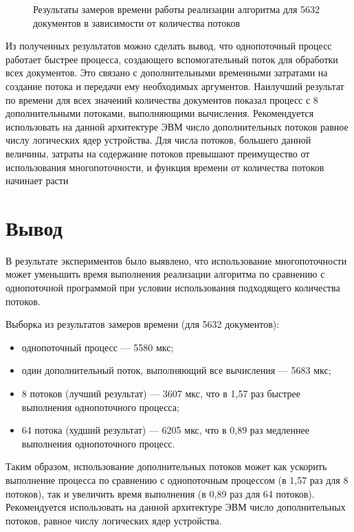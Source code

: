 \clearpage

\begin{figure}[h!]
	\centering
	\caption{Результаты замеров времени работы реализации алгоритма для 5632 документов в зависимости от количества потоков}
	\label{img:g2}
\end{figure}

Из полученных результатов можно сделать вывод, что однопоточный процесс работает быстрее процесса, создающего вспомогательный поток для обработки всех документов. Это связано с дополнительными временными затратами на создание потока и передачи ему необходимых аргументов.
Наилучший результат по времени для всех значений количества документов показал процесс с 8 дополнительными потоками, выполняющими вычисления. Рекомендуется использовать на данной архитектуре ЭВМ число дополнительных потоков равное числу логических ядер устройства.
Для числа потоков, большего данной величины, затраты на содержание потоков превышают преимущество от использования многопоточности, и функция времени от количества потоков начинает расти

\section{Вывод}
В результате экспериментов было выявлено, что использование многопоточности может уменьшить время выполнения реализации алгоритма по сравнению с однопоточной программой при условии использования подходящего количества потоков.

Выборка из результатов замеров времени (для 5632 документов):
\begin{itemize}
	\item однопоточный процесс --- 5580 мкс;
	\item один дополнительный поток, выполняющий все вычисления --- 5683 мкс;
	\item 8 потоков (лучший результат) — 3607 мкс, что в 1,57 раз быстрее выполнения однопоточного процесса;
	\item 64 потока (худший результат) — 6205 мкс, что в 0,89 раз медленнее выполнения однопоточного процесс.
\end{itemize}

Таким образом, использование дополнительных потоков может как ускорить выполнение процесса по сравнению с однопоточным процессом (в 1,57 раз для 8 потоков), так и увеличить время выполнения (в 0,89 раз для 64 потоков).
Рекомендуется использовать на данной архитектуре ЭВМ число дополнительных потоков, равное числу логических ядер устройства.